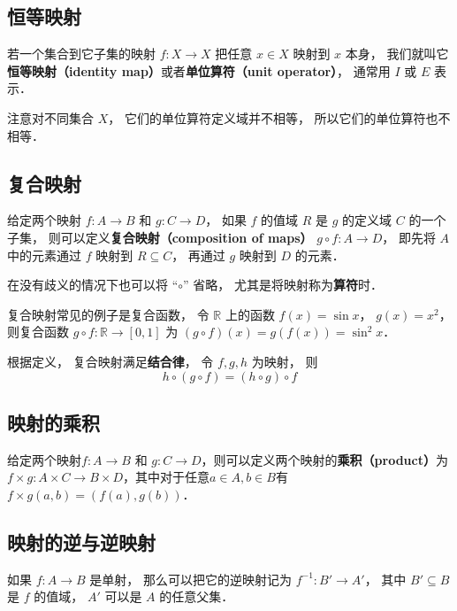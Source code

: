 \subsection{恒等映射}
\begin{definition}{}
若一个集合到它子集的映射 $f:X\to X$ 把任意 $x\in X$ 映射到 $x$ 本身， 我们就叫它\textbf{恒等映射（identity map）}或者\textbf{单位算符（unit operator）}， 通常用 $I$ 或 $E$ 表示．
\end{definition}
注意对不同集合 $X$， 它们的单位算符定义域并不相等， 所以它们的单位算符也不相等．

\subsection{复合映射}
\begin{definition}{}
给定两个映射 $f:A\to B$ 和 $g:C\to D$， 如果 $f$ 的值域 $R$ 是 $g$ 的定义域 $C$ 的一个子集， 则可以定义\textbf{复合映射（composition of maps）} $g\circ f: A\to D$， 即先将 $A$ 中的元素通过 $f$ 映射到 $R \subseteq C$， 再通过 $g$ 映射到 $D$ 的元素．
\end{definition}
在没有歧义的情况下也可以将 “$\circ$” 省略， 尤其是将映射称为\textbf{算符}时．

复合映射常见的例子是复合函数， 令 $\mathbb R$ 上的函数 $f(x) = \sin x$， $g(x) = x^2$， 则复合函数 $g\circ f: \mathbb R \to [0, 1]$ 为 $(g\circ f)(x) = g(f(x)) = \sin^2 x$．

根据定义， 复合映射满足\textbf{结合律}， 令 $f, g, h$ 为映射， 则
\begin{equation}
h \circ (g \circ f) = (h \circ g) \circ f
\end{equation}

\subsection{映射的乘积}

\begin{definition}{}\label{map_def2}
给定两个映射$f:A\to B$ 和 $g:C\to D$，则可以定义两个映射的\textbf{乘积（product）}为$f\times g:A\times C\to B\times D$，其中对于任意$a\in A, b\in B$有$f\times g(a, b)=(f(a), g(b))$．
\end{definition}

\subsection{映射的逆与逆映射}
如果 $f: A\to B$ 是单射， 那么可以把它的逆映射记为 $f^{-1}: B' \to A'$， 其中 $B' \subseteq B$ 是 $f$ 的值域， $A'$ 可以是 $A$ 的任意父集．

